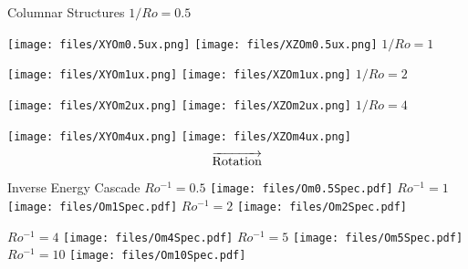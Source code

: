 \documentclass{beamer}
\begin{document}
\begin{frame}{Columnar Structures}
    \centering
        \centering
        $1/Ro = 0.5$
        \vspace{2pt}
        
        \texttt{[image: files/XYOm0.5ux.png]}
        \texttt{[image: files/XZOm0.5ux.png]}
    \emp
    \hspace{1pt}
        \centering
        $1/Ro = 1$
        \vspace{2pt}
 
        \texttt{[image: files/XYOm1ux.png]}
        \texttt{[image: files/XZOm1ux.png]}
    \emp
    \hspace{1pt}
        \centering
        $1/Ro = 2$
        \vspace{2pt}
        
        \texttt{[image: files/XYOm2ux.png]}
        \texttt{[image: files/XZOm2ux.png]}
    \emp
    \hspace{1pt}
        \centering
         $1/Ro = 4$
        \vspace{2pt}

        \texttt{[image: files/XYOm4ux.png]}
        \texttt{[image: files/XZOm4ux.png]}
    \emp
    \[\overrightarrow{\rm Rotation}\]
\end{frame}

\begin{frame}{Inverse Energy Cascade}
        \centering
        $Ro^{-1} = 0.5$
        \texttt{[image: files/Om0.5Spec.pdf]}
    \emp
        \centering
        $Ro^{-1} = 1$
        \texttt{[image: files/Om1Spec.pdf]}
    \emp
        \centering
        $Ro^{-1} = 2$
        \texttt{[image: files/Om2Spec.pdf]}
    \emp
    
        \centering
        $Ro^{-1} = 4$
        \texttt{[image: files/Om4Spec.pdf]}
    \emp
        \centering
        $Ro^{-1} = 5$
        \texttt{[image: files/Om5Spec.pdf]}
    \emp
        \centering
        $Ro^{-1} = 10$
        \texttt{[image: files/Om10Spec.pdf]}
    \emp

\end{frame}
\end{document}
